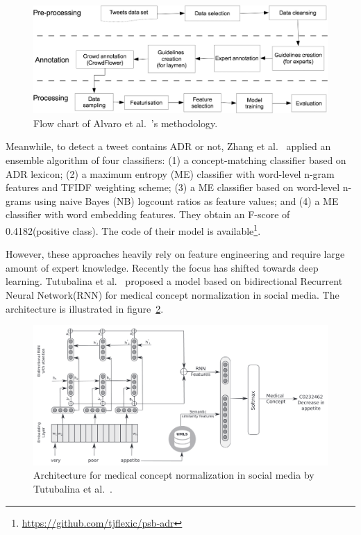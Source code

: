 \begin{figure}[h]
	\centering
	\includegraphics[width=0.99\linewidth]{Figures/n.jpg}
	\caption{Flow chart of Alvaro et al.~\cite{alvaro2015crowdsourcing}’s methodology.}
	\label{fig:flowchart-alvaro}
\end{figure}


Meanwhile, to detect a tweet contains ADR or not, Zhang et al.~\cite{zhang2016ensemble} applied an ensemble algorithm of four classifiers: (1) a concept-matching classifier based on ADR lexicon; (2) a maximum entropy (ME) classifier with word-level n-gram features and TFIDF weighting scheme; (3) a ME classifier based on word-level n-grams using naive Bayes (NB) logcount ratios as feature values; and (4) a ME classifier with word embedding features. They obtain an F-score of 0.4182(positive class). The code of their model is available\footnote{\url{https://github.com/tjflexic/psb-adr}}.


However, these approaches heavily rely on feature engineering and require large amount of expert knowledge. Recently the focus has shifted towards deep learning. Tutubalina et al.~\cite{TUTUBALINA201893} proposed a model based on bidirectional Recurrent Neural Network(RNN) for medical concept normalization in social media. The architecture is illustrated in figure~\ref{fig:architecture-tutubalina}.

\begin{figure}[h]
	\centering
	\includegraphics[width=0.99\linewidth]{Figures/f.png}
	\caption{Architecture for medical concept normalization in social media by Tutubalina et al.~\cite{TUTUBALINA201893}.}
	\label{fig:architecture-tutubalina}
\end{figure}

